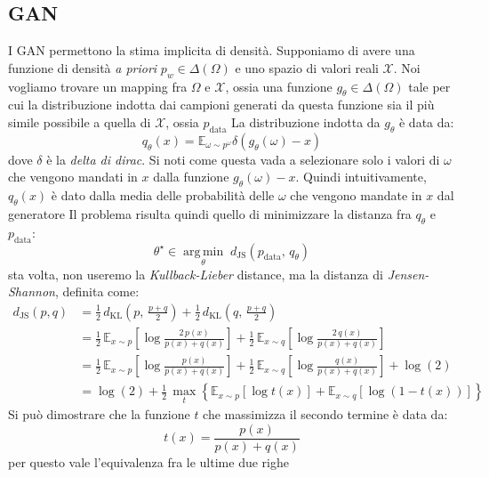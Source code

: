 \subsection{GAN}
I GAN permettono la stima implicita di densità. Supponiamo di avere una funzione di densità \textit{a priori} $ p_w \in \Delta \left(\Omega \right) $ e uno spazio di valori reali $ \mathcal{X} $. Noi vogliamo trovare un mapping fra $ \Omega  $ e $ \mathcal{X} $, ossia una funzione $ g_\theta \in \Delta \left(\Omega \right)  $ tale per cui la distribuzione indotta dai campioni generati da questa funzione sia il più simile possibile a quella di $ \mathcal{X} $, ossia $ p_{\text{data}} $
\vskip3mm
La distribuzione indotta da $ g_\theta $ è data da:
\[
	q_{\theta }\left(x\right) = \mathbb{E}_{\omega  \sim p^{\omega }} \delta\left(g_\theta \left(\omega \right) - x \right)
\]
dove $ \delta  $ è la \textit{delta di dirac}. Si noti come questa vada a selezionare solo i valori di $ \omega  $ che vengono mandati in $ x $ dalla funzione $ g_\theta \left(\omega \right) - x  $. Quindi intuitivamente, $ q_{\theta }\left(x\right) $ è dato dalla media delle probabilità delle $ \omega   $ che vengono mandate in $ x $ dal generatore
\vskip3mm
Il problema risulta quindi quello di minimizzare la distanza fra $ q_\theta $ e $ p_{\text{data}} $:
\[
	\theta^{\star} \in \operatorname*{arg\,min}_{\theta}\; d_{\mathrm{JS}} \left(p_{\text{data}},\, q_{\theta}\right)
\]
sta volta, non useremo la \textit{Kullback-Lieber} distance, ma la distanza di \textit{Jensen-Shannon}, definita come:
\[
	\begin{aligned}
		d_{\mathrm{JS}} \left(p,q\right)
		 & = \tfrac{1}{2}\, d_{\mathrm{KL}} \left(p,\, \tfrac{p+q}{2}\right)
		+ \tfrac{1}{2}\, d_{\mathrm{KL}} \left(q,\, \tfrac{p+q}{2}\right)                      \\[8pt]
		 & = \tfrac{1}{2}\,\mathbb{E}_{x \sim p} \left[ \log \frac{2\,p(x)}{p(x)+q(x)} \right]
		+ \tfrac{1}{2}\,\mathbb{E}_{x \sim q} \left[ \log \frac{2\,q(x)}{p(x)+q(x)} \right]    \\[8pt]
		 & = \tfrac{1}{2}\,\mathbb{E}_{x \sim p} \left[ \log \frac{p(x)}{p(x)+q(x)} \right]
		+ \tfrac{1}{2}\,\mathbb{E}_{x \sim q} \left[ \log \frac{q(x)}{p(x)+q(x)} \right]
		+ \log \left(2\right)                                                                  \\[8pt]
		 & = \log \left(2\right) + \tfrac{1}{2}\, \max_{t}
		\left\{ \mathbb{E}_{x \sim p} \left[ \log t(x) \right]
		+ \mathbb{E}_{x \sim q} \left[ \log \left(1 - t(x)\right) \right] \right\}
	\end{aligned}
\]
Si può dimostrare che la funzione $ t $ che massimizza il secondo termine è data da:
\[
	t\left(x\right) = \frac{p\left(x\right)}{ p\left(x\right) + q\left(x\right)}
\]
per questo vale l'equivalenza fra le ultime due righe

